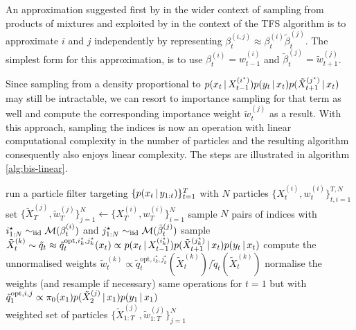 An approximation suggested first by \citet{briers05} in the wider context of sampling from products of mixtures and exploited by \citet{fearnhead10, taghavi12} in the context of the TFS algorithm is to approximate $i$ and $j$ independently by representing $\beta^{(i,j)}_{t}\approx \beta^{(i)}_{t}\tilde\beta^{(j)}_{t}$. The simplest form for this approximation, is to use $\beta^{(i)}_{t} = w^{(i)}_{t-1}$ and $\tilde\beta^{(j)}_{t}=\tilde w^{(j)}_{t+1}$. 

Since sampling from a density proportional to $p(x_{t}\,|\, X^{(i^{\star})}_{t-1})p(y_{t}\,|\, x_{t})p(\tilde X^{(j^{\star})}_{t+1}\,|\, x_{t})$ may still be intractable, we can resort to importance sampling for that term as well and compute the corresponding importance weight $\tilde w_{t}^{(j)}$ as a result.
With this approach, sampling the indices is now an operation with linear computational complexity in the number of particles and the resulting algorithm consequently also enjoys linear complexity. 
The steps are illustrated in algorithm \ref{alg:bis-linear}. 
%
\begin{algorithm}[!h]\small
	\caption{\label{alg:bis-linear}}
	\begin{algorithmic}[1]
		\State run a particle filter targeting $\{p(x_{t}\,|\, y_{1:t})\}_{t=1}^{T}$ with $N$ particles $\{X^{(i)}_{t}, w^{(i)}_{t}\}_{t,i=1}^{T,N}$
		\State set $\{\tilde X^{(j)}_{T},\tilde w^{(j)}_{T}\}_{j=1}^{N}\leftarrow \{X^{(i)}_{T},w^{(i)}_{T}\}_{i=1}^{N}$
			\State sample $N$ pairs of indices with $i^{\star}_{1:N} \sim_{\mathrm{iid}} \mathcal M(\beta^{(i)}_{t})$ and $j^{\star}_{1:N}\sim_{\mathrm{iid}} \mathcal M(\tilde\beta^{(j)}_{t})$
				\State sample $\tilde X^{(k)}_{t}\sim \tilde  q_{t} \approx \tilde q_{t}^{\text{opt}, i^{\star}_{k}, j^{\star}_{k}}(x_{t}) \propto p(x_{t}\,|\, X^{(i^{\star}_{k})}_{t-1})p(\tilde X^{(j^{\star}_{k})}_{t+1}\,|\, x_{t})p(y_{t}\,|\, x_{t})$
	    			\State compute the unnormalised weights $\tilde w^{(k)}_{t} \propto \tilde q^{\text{opt}, i^{\star}_{k},j^{\star}_{k}}_{t}(\tilde X^{(k)}_{t})/\tilde q_{t}(\tilde X^{(k)}_{t})$
			\EndFor
			\State normalise the weights (and resample if necessary)
		\EndFor
	\State same operations for $t=1$ but with $\tilde q^{\text{opt},i,j}_{1} \propto \pi_{0}(x_{1})p(\tilde X^{(j)}_{2}\,|\, x_{1})p(y_{1}\,|\, x_{1})$\\
	\Return weighted set of particles $\{\tilde X^{(j)}_{1:T}, \tilde w^{(j)}_{1:T}\}_{j=1}^{N}$
	\end{algorithmic}
\end{algorithm}


